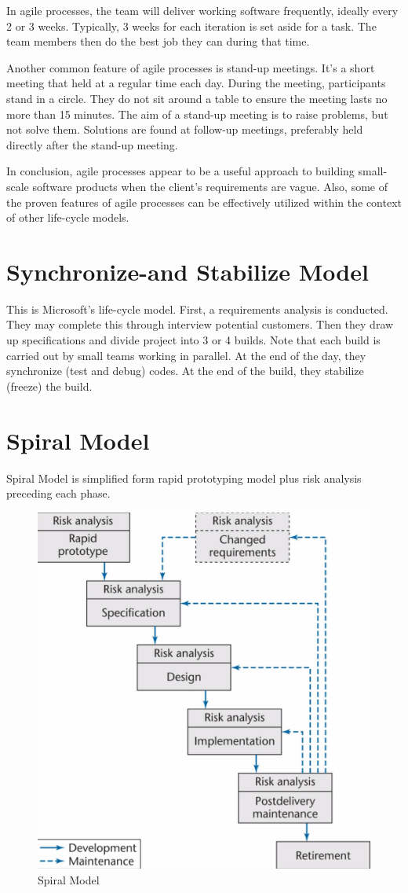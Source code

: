 \documentclass[11pt]{article}
\begin{document}
In agile processes, the team will deliver working software frequently, ideally every 2 or 3 weeks. Typically, 3 weeks for each iteration is set aside for a task. The team members then do the best job they can during that time.

Another common feature of agile processes is stand-up meetings. It's a short meeting that held at a regular time each day. During the meeting, participants stand in a circle. They do not sit around a table to ensure the meeting lasts no more than 15 minutes. The aim of a stand-up meeting is to raise problems, but not solve them. Solutions are found at follow-up meetings, preferably held directly after the stand-up meeting.

In conclusion, agile processes appear to be a useful approach to building small-scale software products when the client’s requirements are vague. Also, some of the proven features of agile processes can be effectively utilized within the context of other life-cycle models.

\section*{Synchronize-and Stabilize Model}

This is Microsoft’s life-cycle model. First, a requirements analysis is conducted. They may complete this through interview potential customers. Then they draw up specifications and divide project into 3 or 4 builds. Note that each build is carried out by small teams working in parallel. At the end of the day, they synchronize (test and debug) codes. At the end of the build, they stabilize (freeze) the build.

\section*{Spiral Model}

Spiral Model is simplified form rapid prototyping model plus risk analysis preceding each phase.

\begin{figure}[h]
	\centering
	\includegraphics[width=0.4\linewidth]{images/Spiral.png}
	\caption{Spiral Model}
	\label{fig:Spiral}
\end{figure}
\end{document}
